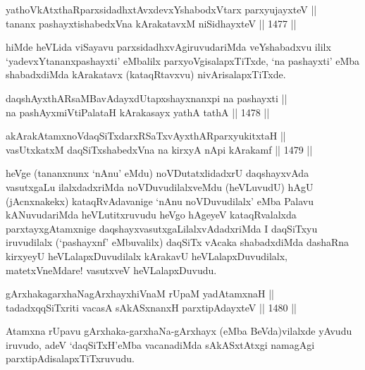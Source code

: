 \begin{shl}
yathoVkAtxthaRparxsidadhxtAvxdevxYshabodxV\s tarx parxyujayxteV || \\
tananx pashayxtishabedxVna kArakatavxM niSidhayxteV \hfill || 1477 ||  
\end{shl}

\begin{artha}
hiMde heVLida viSayavu parxsidadhxvAgiruvudariMda veYshabadxvu ililx `yadevxYtananxpashayxti' eMbalilx parxyoVgisalapxTiTxde, `na pashayxti' eMba shabadxdiMda kArakatavx (kataqRtavxvu) nivArisalapxTiTxde.
\end{artha}

\begin{shl}
daqshAyxthARsaMBavAdayxdUtapxshayxnanxpi na pashayxti ||  \\
na pashAyxmiVtiPalataH kArakasayx yathA tathA \hfill || 1478 ||  
\end{shl}
				
\begin{shl}
akArakAtamxnoV\s daqSiTxdarxRSaTxvAyxthARparxyukitxtaH || \\
vasUtxkatxM daqSiTxshabedxVna na kirxyA nApi kArakamf \hfill || 1479 ||  
\end{shl}

\begin{artha}
heVge (tananxnunx `nAnu' eMdu) noVDutatxlidadxrU daqshayxvAda vasutxgaLu ilalxdadxriMda noVDuvudilalxveMdu (heVLuvudU) hAgU (jAcnxnakekx) kataqRvAdavanige `nAnu noVDuvudilalx' eMba Palavu kANuvudariMda heVLutitxruvudu heVgo hAgeyeV kataqRvalalxda parxtayxgAtamxnige daqshayxvasutxgaLilalxvAdadxriMda I daqSiTxyu iruvudilalx (`pashayxnf' eMbuvalilx) daqSiTx vAcaka shabadxdiMda dashaRna kirxyeyU heVLalapxDuvudilalx kArakavU heVLalapxDuvudilalx, matetxVneMdare! vasutxveV heVLalapxDuvudu.
\end{artha}


\begin{shl}
gArxhakagarxhaNagArxhayxhiVnaM rUpaM yadAtamxnaH || \\
tadadxqqSiTxriti vacasA sAkASxnanxH parxtipAdayxteV \hfill || 1480 ||  
\end{shl}

\begin{artha}
Atamxna rUpavu gArxhaka-garxhaNa-gArxhayx (eMba BeVda)vilalxde yAvudu iruvudo, adeV `daqSiTxH'eMba vacanadiMda sAkASxtAtxgi namagAgi parxtipAdisalapxTiTxruvudu.
\end{artha}

